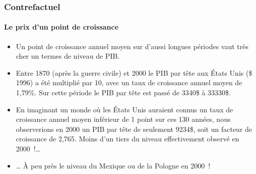 \documentclass[10pt]{beamer}
\begin{document}
\begin{frame}
  \frametitle{Contrefactuel}
  \framesubtitle{Le prix d'un point de croissance}

  \begin{itemize}

  \item Un point de croissance annuel moyen sur d'aussi longues périodes vaut très cher un termes de niveau de PIB.\newline

  \item Entre 1870 (après la guerre civile) et 2000 le PIB par tête aux États Unis (\$ 1996) a été multiplié par 10, avec un taux de croissance annuel moyen de 1,79\%. Sur cette période le PIB par tête est passé de  3340\$ à 33330\$.\newline

  \item En imaginant un monde où les États Unis auraient connus un taux de croissance annuel moyen inférieur de 1 point sur ces 130 années, nous observerions en 2000 un PIB par tête de seulement 9234\$, soit un facteur de croissance de 2,765. Moins d'un tiers du niveau effectivement observé en 2000 !…\newline

  \item … À peu près le niveau du Mexique ou de la Pologne en 2000 !

  \end{itemize}

\end{frame}
\end{document}
